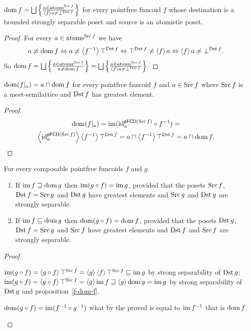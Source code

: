 \begin{prop}
$\dom f=\bigsqcup\setcond{a\in\atoms^{\Src f}}{\supfun fa\ne\bot^{\Dst f}}$
for every pointfree funcoid $f$ whose destination is a bounded strongly separable poset
and source is an atomistic poset.\end{prop}
\begin{proof}
For every $a\in\operatorname{atoms}^{\operatorname{Src} f}$ we have 
\[
a\not\asymp\operatorname{dom} f\Leftrightarrow a\not\asymp\left\langle f^{-1}\right\rangle\top^{\operatorname{Dst} f}\Leftrightarrow\top^{\operatorname{Dst} f}\not\asymp\left\langle f\right\rangle a\Leftrightarrow\left\langle f\right\rangle a\ne\bot^{\operatorname{Dst} f}.
\]
So $\dom f=\bigsqcup\setcond{a\in\atoms^{\Src f}}{a\nasymp\dom f}=\bigsqcup\setcond{a\in\atoms^{\Src f}}{\supfun fa\ne\bot^{\Dst f}}$.\end{proof}
\begin{prop}
$\operatorname{dom}(f|_{a})=a\sqcap\operatorname{dom} f$ for every pointfree funcoid $f$ and
$a\in\operatorname{Src} f$ where $\operatorname{Src} f$ is a meet-semilattice and
$\operatorname{Dst} f$ has greatest element.\end{prop}
\begin{proof}
~
\begin{multline*}
\operatorname{dom}(f|_{a})=\operatorname{im}({\operatorname{id}}_{a}^{\mathsf{pFCD}(\operatorname{Src} f)}\circ f^{-1})=\\
\left\langle {\operatorname{id}}_{a}^{\mathsf{pFCD}(\operatorname{Src} f)}\right\rangle\left\langle f^{-1}\right\rangle\top^{\operatorname{Dst} f}=a\sqcap\left\langle f^{-1}\right\rangle\top^{\operatorname{Dst} f}=a\sqcap\operatorname{dom} f.
\end{multline*}
\end{proof}
\begin{prop}
For every composable pointfree funcoids $f$ and $g$
\begin{enumerate}
\item \label{pf-im-ge-dom}If $\operatorname{im} f\sqsupseteq\operatorname{dom} g$ then $\operatorname{im}(g\circ f)=\operatorname{im} g$, provided that
the posets $\operatorname{Src} f$, $\operatorname{Dst} f=\operatorname{Src} g$ and $\operatorname{Dst} g$ have greatest elements and $\operatorname{Src} g$ and $\operatorname{Dst} g$ are strongly separable.
\item \label{pf-im-le-dom}If $\operatorname{im} f\sqsubseteq\operatorname{dom} g$ then $\operatorname{dom}(g\circ f)=\operatorname{dom} f$, provided that
the posets $\operatorname{Dst} g$, $\operatorname{Dst} f=\operatorname{Src} g$ and $\operatorname{Src} f$ have greatest elements and $\operatorname{Dst} f$ and $\operatorname{Src} f$ are strongly separable.
\end{enumerate}
\end{prop}
\begin{proof}
~
\begin{widedisorder}
\item [{\ref{pf-im-ge-dom}}] $\operatorname{im}(g\circ f)=\left\langle g\circ f\right\rangle\top^{\operatorname{Src} f}=\left\langle g\right\rangle\left\langle f\right\rangle\top^{\operatorname{Src} f}\sqsubseteq\operatorname{im} g$
by strong separability of $\operatorname{Dst} g$;
$\operatorname{im}(g\circ f)=\left\langle g\circ f\right\rangle\top^{\operatorname{Src} f}=\left\langle g\right\rangle\operatorname{im} f\sqsupseteq\left\langle g\right\rangle\operatorname{dom} g=\operatorname{im} g$ by strong separability of $\operatorname{Dst} g$
and proposition~\ref{f-dom-f}.
\item [{\ref{pf-im-le-dom}}] $\operatorname{dom}(g\circ f)=\operatorname{im}(f^{-1}\circ g^{-1})$
what by the proved is equal to $\operatorname{im} f^{-1}$ that is $\operatorname{dom} f$.
\end{widedisorder}
\end{proof}

